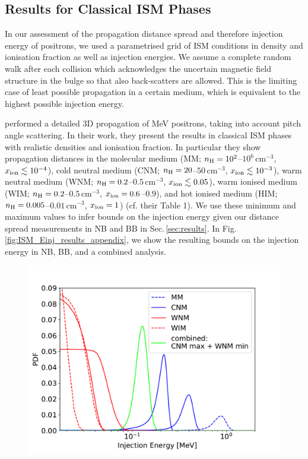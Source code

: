 \documentclass[doublespace,draft,nopageskip]{VTthesis} %
\newcommand{\mrm}[1]{\mathrm{#1}}
\begin{document}
\begin{appendices}
	
	\section{Results for Classical ISM Phases}\label{sec:ISM_phases_results}
	In our assessment of the propagation distance spread and therefore injection energy of positrons, we used a parametrised grid of ISM conditions in density and ionisation fraction as well as injection energies.
	We assume a complete random walk after each collision which acknowledges the uncertain magnetic field structure in the bulge so that also back-scatters are allowed.
	This is the limiting case of least possible propagation in a certain medium, which is equivalent to the highest possible injection energy.
	
	\citet{Jean2009_511ISM} performed a detailed 3D propagation of MeV positrons, taking into account pitch angle scattering.
	In their work, they present the results in classical ISM phases with realistic densities and ionisation fraction.
	In particular they show propagation distances in the molecular medium (MM; $n_{\rm H} = 10^2$--$10^6\,\mrm{cm^{-3}}$, $x_{\rm ion} \lesssim 10^{-4}$), cold neutral medium (CNM; $n_{\rm H} = 20$--$50\,\mrm{cm^{-3}}$, $x_{\rm ion} \lesssim 10^{-3}$), warm neutral medium (WNM; $n_{\rm H} = 0.2$--$0.5\,\mrm{cm^{-3}}$, $x_{\rm ion} \lesssim 0.05$), warm ionised medium (WIM; $n_{\rm H} = 0.2$--$0.5\,\mrm{cm^{-3}}$, $x_{\rm ion} = 0.6$--$0.9$), and hot ionised medium (HIM; $n_{\rm H} = 0.005$--$0.01\,\mrm{cm^{-3}}$, $x_{\rm ion} = 1$) (cf. their Table 1).
	We use these minimum and maximum values to infer bounds on the injection energy given our distance spread measurements in NB and BB in Sec.\,\ref{sec:results}.
	In Fig.\,\ref{fig:ISM_Einj_results_appendix}, we show the resulting bounds on the injection energy in NB, BB, and a combined analysis.
	\begin{figure}
		\centering
		\includegraphics[width=0.8\columnwidth,trim=0.10in 0.1in 0.6in 0.6in,clip=true]{Figures/511keV/Comparison_NB_BB_Jean2009_Fig8_comb.pdf}%

\end{figure}
\end{appendices}
\end{document}
